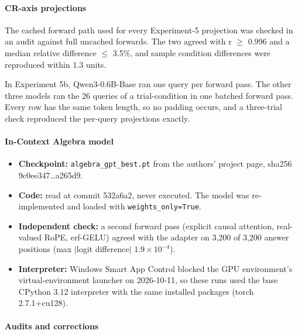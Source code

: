 \documentclass[11pt]{article}
\begin{document}
\paragraph{CR-axis projections}

The cached forward path used for every Experiment-5 projection was checked in an audit against full uncached forwards. The two agreed with r $\geq$ 0.996 and a median relative difference $\leq$ 3.5\%, and sample condition differences were reproduced within 1.3 units.

In Experiment 5b, Qwen3-0.6B-Base ran one query per forward pass. The other three models ran the 26 queries of a trial-condition in one batched forward pass. Every row has the same token length, so no padding occurs, and a three-trial check reproduced the per-query projections exactly.

\paragraph{In-Context Algebra model}

\begin{itemize}
  \item \textbf{Checkpoint:} \texttt{algebra\_gpt\_best.pt} from the authors' project page, sha256 9c0ee347\ldots{}a265d9.
  \item \textbf{Code:} read at commit 532a6a2, never executed. The model was re-implemented and loaded with \texttt{weights\_only=True}.
  \item \textbf{Independent check:} a second forward pass (explicit causal attention, real-valued RoPE, erf-GELU) agreed with the adapter on 3,200 of 3,200 answer positions (max $|$logit difference$|$ $1.9 \times 10^{-4}$).
  \item \textbf{Interpreter:} Windows Smart App Control blocked the GPU environment's virtual-environment launcher on 2026-10-11, so these runs used the base CPython 3.12 interpreter with the same installed packages (torch 2.7.1+cu128).
\end{itemize}

\paragraph{Audits and corrections}
\end{document}
